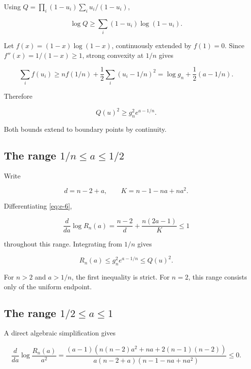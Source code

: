 \documentclass[11pt,a4paper]{article}
\theoremstyle{definition}
\theoremstyle{remark}
\begin{document}
Using \(Q=\prod_i(1-u_i)\sum_i u_i/(1-u_i)\),

\begin{equation}\label{eq:e-8}
\log Q\ge\sum_i(1-u_i)\log(1-u_i).
\end{equation}

Let \(f(x)=(1-x)\log(1-x)\), continuously extended by \(f(1)=0\). Since
\(f''(x)=1/(1-x)\ge1\), strong convexity at \(1/n\) gives

\[
\sum_i f(u_i)\ge nf(1/n)+\frac12\sum_i(u_i-1/n)^2
=\log g_n+\frac12(a-1/n).
\]

Therefore

\begin{equation}\label{eq:e-9}
\boxed{Q(u)^2\ge g_n^2e^{a-1/n}.}
\end{equation}

Both bounds extend to boundary points by continuity.

\subsection{\texorpdfstring{The range
\(1/n\le a\le1/2\)}{The range 1/n to 1/2}}\label{special-the-range-1nle-ale12}

Write

\[
d=n-2+a,\qquad K=n-1-na+na^2.
\]

Differentiating \eqref{eq:e-6},

\[
\frac{d}{da}\log R_n(a)
=\frac{n-2}{d}+\frac{n(2a-1)}K\le1
\]

throughout this range. Integrating from \(1/n\) gives

\begin{equation}\label{eq:e-10}
R_n(a)\le g_n^2e^{a-1/n}\le Q(u)^2.
\end{equation}

For \(n>2\) and \(a>1/n\), the first inequality is strict. For \(n=2\),
this range consists only of the uniform endpoint.

\subsection{\texorpdfstring{The range
\(1/2\le a\le1\)}{The range 1/2 to 1}}\label{special-the-range-12le-ale1}

A direct algebraic simplification gives

\begin{equation}\label{eq:e-11}
\frac d{da}\log\frac{R_n(a)}{a^2}
=
\frac{(a-1)\left(n(n-2)a^2+na+2(n-1)(n-2)\right)}
{a(n-2+a)(n-1-na+na^2)}
\le0.
\end{equation}
\end{document}
